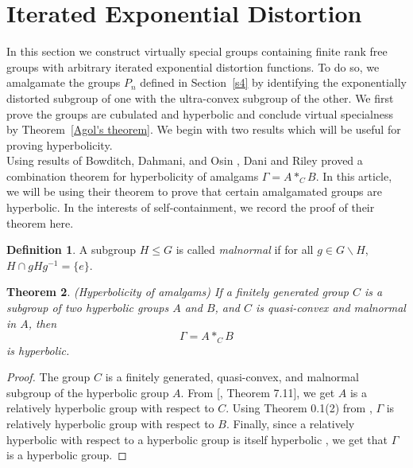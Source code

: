 \documentclass[oneside,11pt,reqno]{amsart}
\newtheorem{thm}{Theorem}[section]
\theoremstyle{definition}
\newtheorem{defn}[thm]{Definition}
\begin{document}
\section{Iterated Exponential Distortion}\label{s5}

In this section we construct virtually special groups containing finite rank free groups with arbitrary iterated exponential distortion functions. To do so, we amalgamate the groups $P_n$ defined in Section~\ref{s4} by identifying the exponentially distorted subgroup of one with the ultra-convex subgroup of the other. We first prove the groups are cubulated and hyperbolic and conclude virtual specialness by Theorem~\ref{Agol's theorem}. We begin with two results which will be useful for proving hyperbolicity.\\

Using results of Bowditch, Dahmani, and Osin \cite[Theorem 15.4]{DARI} , Dani and Riley proved a combination theorem for hyperbolicity of amalgams $\Gamma = A\ast_CB$. In this article, we will be using their theorem to prove that certain amalgamated groups are hyperbolic. In the interests of self-containment, we record the proof of their theorem here.


\begin{defn}
    A subgroup $H\leq G$ is called \textit{malnormal} if for all $g \in G \backslash H$,
    $H \cap gHg^{-1} = \{e\}$.
\end{defn}

\begin{thm}\label{amalhyp}\cite[Theorem 15.4]{DARI} (Hyperbolicity of amalgams) 
If a finitely generated group $C$ is a subgroup of two hyperbolic groups $A$ and $B$, and $C$ is quasi-convex and malnormal in $A$, then $$\Gamma = A \ast_C B$$ is hyperbolic.%

\end{thm}


\begin{proof}
The group $C$ is a finitely generated, quasi-convex, and malnormal subgroup of the hyperbolic group $A$. From [\cite{MR2922380}, Theorem 7.11], we get $A$ is a relatively hyperbolic group with respect to $C$. Using  Theorem 0.1(2) from \cite{MR2026551}, $\Gamma$ is relatively hyperbolic group with respect to $B$. Finally, since a relatively hyperbolic with respect to a hyperbolic group is itself hyperbolic \cite[Corollary 2.41]{MR2182268}, we get that $\Gamma$ is a hyperbolic group. %

\end{proof}
\end{document}
